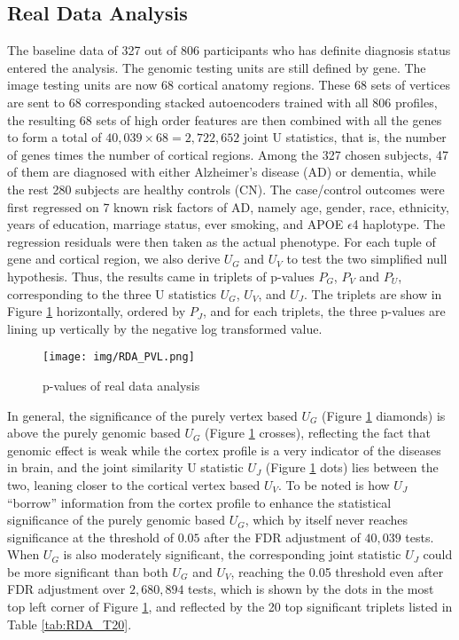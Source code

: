 \subsection{Real Data Analysis}
The baseline data of 327 out of 806 participants who has definite diagnosis status entered the analysis. The genomic testing units are still defined by gene. The image testing units are now 68 cortical anatomy regions. These 68 sets of vertices are sent to 68 corresponding stacked autoencoders trained with all 806 profiles, the resulting 68 sets of high order features are then combined with all the genes to form a total of $40,039 \times 68 = 2,722,652$ joint U statistics, that is, the number of genes times the number of cortical regions. Among the 327 chosen subjects, 47 of them are diagnosed with either Alzheimer's disease (AD) or dementia, while the rest 280 subjects are healthy controls (CN). The case/control outcomes were first regressed on 7 known risk factors of AD, namely age, gender, race, ethnicity, years of education, marriage status, ever smoking, and APOE $\epsilon$4 haplotype. The regression residuals were then taken as the actual phenotype. For each tuple of gene and cortical region, we also derive $U_G$ and $U_V$ to test the two simplified null hypothesis. Thus, the results came in triplets of p-values $P_G$, $P_V$ and $P_U$, corresponding to the three U statistics $U_G$, $U_V$, and $U_J$. The triplets are show in Figure \ref{fig:RDA_PVL} horizontally, ordered by $P_J$, and for each triplets, the three p-values are lining up vertically by the negative log transformed value.
\begin{figure}[!htbp]
\centering
\texttt{[image: img/RDA\_PVL.png]}
\caption{p-values of real data analysis}
\label{fig:RDA_PVL}
\end{figure}
In general, the significance of the purely vertex based $U_G$ (Figure \ref{fig:RDA_PVL} diamonds) is above the purely genomic based $U_G$ (Figure \ref{fig:RDA_PVL} crosses), reflecting the fact that genomic effect is weak while the cortex profile is a very indicator of the diseases in brain, and the joint similarity U statistic $U_J$ (Figure \ref{fig:RDA_PVL} dots) lies between the two, leaning closer to the cortical vertex based $U_V$. To be noted is how $U_J$ ``borrow'' information from the cortex profile to enhance the statistical significance of the purely genomic based $U_G$, which by itself never reaches significance at the threshold of $0.05$ after the FDR adjustment of $40,039$ tests. When $U_G$ is also moderately significant, the corresponding joint statistic $U_J$ could be more significant than both $U_G$ and $U_V$, reaching the 0.05 threshold even after FDR adjustment over $2,680,894$ tests, which is shown by the dots in the most top left corner of Figure \ref{fig:RDA_PVL}, and reflected by the 20 top significant triplets listed in Table \ref{tab:RDA_T20}.
